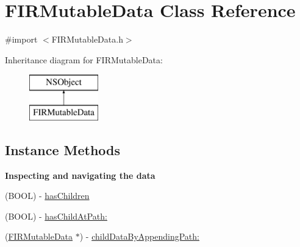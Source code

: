 \hypertarget{interface_f_i_r_mutable_data}{}\section{F\+I\+R\+Mutable\+Data Class Reference}
\label{interface_f_i_r_mutable_data}


{\ttfamily \#import $<$F\+I\+R\+Mutable\+Data.\+h$>$}

Inheritance diagram for F\+I\+R\+Mutable\+Data\+:\begin{figure}[H]
\begin{center}
\leavevmode
\includegraphics[height=2.000000cm]{interface_f_i_r_mutable_data}
\end{center}
\end{figure}
\subsection*{Instance Methods}
\begin{Indent}{\bf Inspecting and navigating the data}\par
\begin{DoxyCompactItemize}
\item 
(B\+O\+O\+L) -\/ \hyperlink{interface_f_i_r_mutable_data_ad0f1c9128ab6343b99beffb20d83189f}{has\+Children}
\item 
(B\+O\+O\+L) -\/ \hyperlink{interface_f_i_r_mutable_data_ac653abad42d1327c099e48969a7978d7}{has\+Child\+At\+Path\+:}
\item 
(\hyperlink{interface_f_i_r_mutable_data}{F\+I\+R\+Mutable\+Data} $\ast$) -\/ \hyperlink{interface_f_i_r_mutable_data_a4ac67a2165ca92345b12cb4761eca460}{child\+Data\+By\+Appending\+Path\+:}
\end{DoxyCompactItemize}
\end{Indent}
